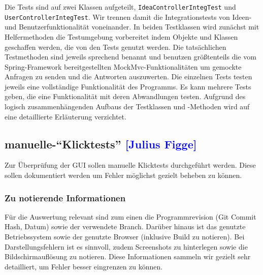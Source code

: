 Die Tests sind auf zwei Klassen aufgeteilt, \texttt{IdeaControllerIntegTest} und \texttt{UserControllerIntegTest}. Wir trennen damit die Integrationstests von Ideen- und Benutzerfunktionalität voneinander. In beiden Testklassen wird zunächst mit Helfermethoden die Testumgebung vorbereitet indem Objekte und Klassen geschaffen werden, die von den Tests genutzt werden.
Die tatsächlichen Testmethoden sind jeweils sprechend benannt und benutzen größtenteils die vom Spring-Framework bereitgestellten MockMvc-Funktionalitäten um gemockte Anfragen zu senden und die Antworten auszuwerten. Die einzelnen Tests testen jeweils eine vollständige Funktionalität des Programms. Es kann mehrere Tests geben, die eine Funktionalität mit deren Abwandlungen testen.
Aufgrund des logisch zusammenhängenden Aufbaus der Testklassen und -Methoden wird auf eine detaillierte Erläuterung verzichtet.

\subsection{manuelle-\enquote{Klicktests} \textcolor{blue}{[Julius Figge]}}

Zur Überprüfung der GUI sollen manuelle Klicktests durchgeführt werden.
Diese sollen dokumentiert werden um Fehler möglichst gezielt beheben zu können.\\

\subsubsection*{Zu notierende Informationen}
Für die Auswertung relevant sind zum einen die Programmrevision (Git Commit Hash, Datum) sowie der verwendete Branch. Darüber hinaus ist das genutzte Betriebssystem sowie der genutzte Browser (inklusive Build zu notieren).
Bei Darstellungsfehlern ist es sinnvoll, zudem Screenshots zu hinterlegen sowie die Bildschirmauflösung zu notieren.
Diese Informationen sammeln wir gezielt sehr detailliert, um Fehler besser eingrenzen zu können.

